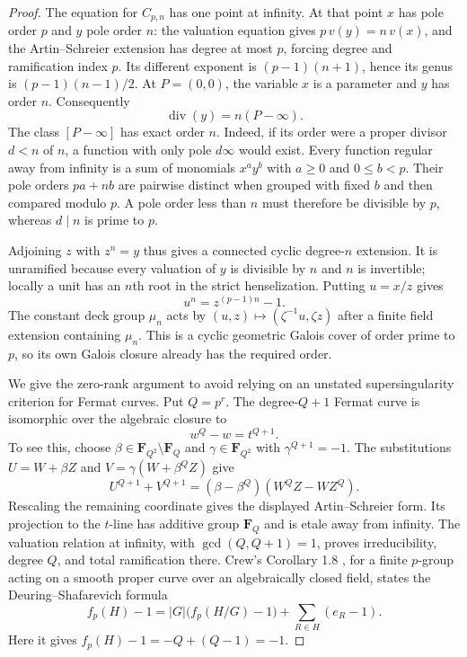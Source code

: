 \begin{proof}
The equation for $C_{p,n}$ has one point at infinity. At that
point $x$ has pole order $p$ and $y$ pole order $n$:
the valuation equation gives $p\,v(y)=n\,v(x)$, and the
Artin--Schreier extension has degree at most $p$, forcing
degree and ramification index $p$. Its different exponent is
$(p-1)(n+1)$, hence its genus is $(p-1)(n-1)/2$.
At $P=(0,0)$, the variable $x$ is a parameter and $y$ has
order $n$. Consequently
\[
                          \operatorname{div}(y)=n(P-\infty).
\]
The class $[P-\infty]$ has exact order $n$. Indeed, if its
order were a proper divisor $d<n$ of $n$, a function with
only pole $d\infty$ would exist. Every function regular away
from infinity is a sum of monomials $x^a y^b$ with $a\ge0$
and $0\le b<p$. Their pole orders $pa+nb$ are pairwise
distinct when grouped with fixed $b$ and then compared
modulo $p$. A pole order less than $n$ must therefore be
divisible by $p$, whereas $d\mid n$ is prime to $p$.

Adjoining $z$ with $z^n=y$ thus gives a connected cyclic
degree-$n$ extension. It is unramified because every
valuation of $y$ is divisible by $n$ and $n$ is invertible;
locally a unit has an $n$th root in the strict henselization.
Putting $u=x/z$ gives
\[
                           u^n=z^{(p-1)n}-1.
\]
The constant deck group $\mu_n$ acts by
$(u,z)\mapsto(\zeta^{-1}u,\zeta z)$ after a finite field
extension containing $\mu_n$. This is a cyclic geometric
Galois cover of order prime to $p$, so its own Galois closure
already has the required order.

We give the zero-rank argument to avoid relying on an
unstated supersingularity criterion for Fermat curves. Put
$Q=p^r$. The degree-$Q+1$ Fermat curve is isomorphic over
the algebraic closure to
\[
                        w^Q-w=t^{Q+1}.
\]
To see this, choose $\beta\in\mathbf F_{Q^2}\setminus\mathbf F_Q$
and $\gamma\in\mathbf F_{Q^2}$ with $\gamma^{Q+1}=-1$.
The substitutions
$U=W+\beta Z$ and $V=\gamma(W+\beta^Q Z)$ give
\[
 U^{Q+1}+V^{Q+1}
       =(\beta-\beta^Q)(W^QZ-WZ^Q).
\]
Rescaling the remaining coordinate gives the displayed
Artin--Schreier form. Its projection to the $t$-line has
additive group $\mathbf F_Q$ and is etale away from infinity.
The valuation relation at infinity, with
$\gcd(Q,Q+1)=1$, proves irreducibility, degree $Q$, and
total ramification there. Crew's Corollary 1.8
\cite{AG_Crew1984}, for a finite $p$-group acting on a
smooth proper curve over an algebraically closed field,
states the Deuring--Shafarevich formula
\[
 f_p(H)-1=|G|\bigl(f_p(H/G)-1\bigr)
                       +\sum_{R\in H}(e_R-1).
\]
Here it gives $f_p(H)-1=-Q+(Q-1)=-1$.


\end{proof}
